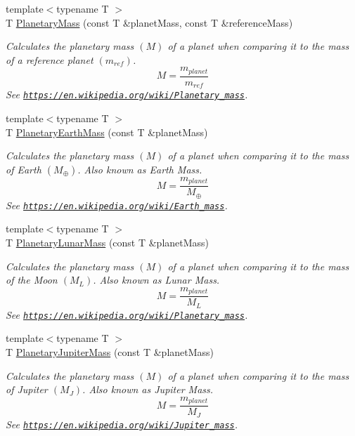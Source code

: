 \begin{DoxyCompactItemize}
{\footnotesize template$<$typename T $>$ }\\T \mbox{\hyperlink{group___e_g_x_phys-_planetary_mass_ga225bcf56fb37468f6d4d46493d403503}{Planetary\+Mass}} (const T \&planet\+Mass, const T \&reference\+Mass)
\begin{DoxyCompactList}\small\item\em Calculates the planetary mass $(M)$ of a planet when comparing it to the mass of a reference planet $(m_{ref})$. \[M=\frac{m_{planet}}{m_{ref}}\] See \href{https://en.wikipedia.org/wiki/Planetary_mass}{\tt https\+://en.\+wikipedia.\+org/wiki/\+Planetary\+\_\+mass}. \end{DoxyCompactList}\item 
{\footnotesize template$<$typename T $>$ }\\T \mbox{\hyperlink{group___e_g_x_phys-_planetary_mass_ga3d918c2d37a72b42b49aa6c3da08f450}{Planetary\+Earth\+Mass}} (const T \&planet\+Mass)
\begin{DoxyCompactList}\small\item\em Calculates the planetary mass $(M)$ of a planet when comparing it to the mass of Earth $(M_\oplus)$. Also known as Earth Mass. \[M=\frac{m_{planet}}{M_\oplus}\] See \href{https://en.wikipedia.org/wiki/Earth_mass}{\tt https\+://en.\+wikipedia.\+org/wiki/\+Earth\+\_\+mass}. \end{DoxyCompactList}\item 
{\footnotesize template$<$typename T $>$ }\\T \mbox{\hyperlink{group___e_g_x_phys-_planetary_mass_gaaea9675ef409d141d269d970f2f5e9dd}{Planetary\+Lunar\+Mass}} (const T \&planet\+Mass)
\begin{DoxyCompactList}\small\item\em Calculates the planetary mass $(M)$ of a planet when comparing it to the mass of the Moon $(M_L)$. Also known as Lunar Mass. \[M=\frac{m_{planet}}{M_L}\] See \href{https://en.wikipedia.org/wiki/Planetary_mass}{\tt https\+://en.\+wikipedia.\+org/wiki/\+Planetary\+\_\+mass}. \end{DoxyCompactList}\item 
{\footnotesize template$<$typename T $>$ }\\T \mbox{\hyperlink{group___e_g_x_phys-_planetary_mass_gaadff5ffa04bb55a572c1403ab9500c06}{Planetary\+Jupiter\+Mass}} (const T \&planet\+Mass)
\begin{DoxyCompactList}\small\item\em Calculates the planetary mass $(M)$ of a planet when comparing it to the mass of Jupiter $(M_J)$. Also known as Jupiter Mass. \[M=\frac{m_{planet}}{M_J}\] See \href{https://en.wikipedia.org/wiki/Jupiter_mass}{\tt https\+://en.\+wikipedia.\+org/wiki/\+Jupiter\+\_\+mass}. \end{DoxyCompactList}\item 

\end{DoxyCompactItemize}
